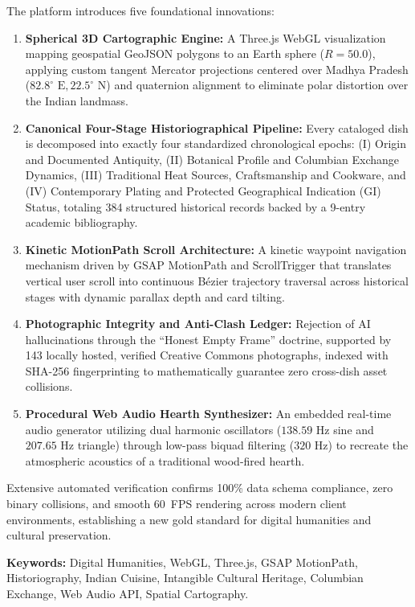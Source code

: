 \documentclass[11pt,a4paper]{report}
\begin{document}
The platform introduces five foundational innovations:
\begin{enumerate}[label=(\roman*)]
    \item \textbf{Spherical 3D Cartographic Engine:} A Three.js WebGL visualization mapping geospatial GeoJSON polygons to an Earth sphere ($R = 50.0$), applying custom tangent Mercator projections centered over Madhya Pradesh ($82.8^\circ\text{ E}, 22.5^\circ\text{ N}$) and quaternion alignment to eliminate polar distortion over the Indian landmass.
    \item \textbf{Canonical Four-Stage Historiographical Pipeline:} Every cataloged dish is decomposed into exactly four standardized chronological epochs: (I) Origin and Documented Antiquity, (II) Botanical Profile and Columbian Exchange Dynamics, (III) Traditional Heat Sources, Craftsmanship and Cookware, and (IV) Contemporary Plating and Protected Geographical Indication (GI) Status, totaling 384 structured historical records backed by a 9-entry academic bibliography.
    \item \textbf{Kinetic MotionPath Scroll Architecture:} A kinetic waypoint navigation mechanism driven by GSAP MotionPath and ScrollTrigger that translates vertical user scroll into continuous Bézier trajectory traversal across historical stages with dynamic parallax depth and card tilting.
    \item \textbf{Photographic Integrity and Anti-Clash Ledger:} Rejection of AI hallucinations through the ``Honest Empty Frame'' doctrine, supported by 143 locally hosted, verified Creative Commons photographs, indexed with SHA-256 fingerprinting to mathematically guarantee zero cross-dish asset collisions.
    \item \textbf{Procedural Web Audio Hearth Synthesizer:} An embedded real-time audio generator utilizing dual harmonic oscillators ($138.59\text{ Hz}$ sine and $207.65\text{ Hz}$ triangle) through low-pass biquad filtering ($320\text{ Hz}$) to recreate the atmospheric acoustics of a traditional wood-fired hearth.
\end{enumerate}

Extensive automated verification confirms 100\% data schema compliance, zero binary collisions, and smooth 60~FPS rendering across modern client environments, establishing a new gold standard for digital humanities and cultural preservation.

\vspace{0.8cm}
\noindent\textbf{Keywords:} Digital Humanities, WebGL, Three.js, GSAP MotionPath, Historiography, Indian Cuisine, Intangible Cultural Heritage, Columbian Exchange, Web Audio API, Spatial Cartography.
\end{document}
